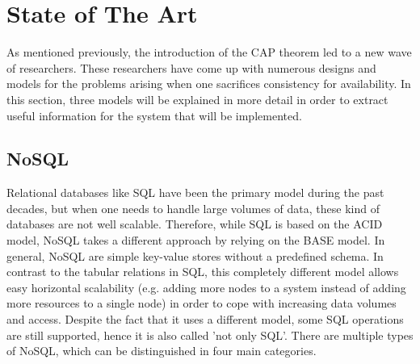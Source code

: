 \documentclass[a4paper,12pt]{report}
\begin{document}
\section{State of The Art}\label{sec:StateOfTheArt}

As mentioned previously, the introduction of the CAP theorem led to a new wave of researchers. These researchers have come up with numerous designs and models for the problems arising when one sacrifices consistency for availability. In this section, three models will be explained in more detail in order to extract useful information for the system that will be implemented. 

\subsection{NoSQL}\label{subsec:NoSQL}

Relational databases like SQL have been the primary model during the past decades, but when one needs to handle large volumes of data, these kind of databases are not well scalable. Therefore, while SQL is based on the ACID model, NoSQL takes a different approach by relying on the BASE model. In general, NoSQL are simple key-value stores without a predefined schema. In contrast to the tabular relations in SQL, this completely different model allows easy horizontal scalability (e.g. adding more nodes to a system instead of adding more resources to a single node) in order to cope with increasing data volumes and access. Despite the fact that it uses a different model, some SQL operations are still supported, hence it is also called 'not only SQL'. There are multiple types of NoSQL, which can be distinguished in four main categories. 
\end{document}
